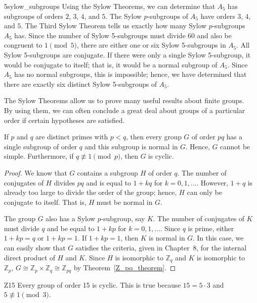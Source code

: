  
\begin{example}{5sylow_subgroups}
Using the Sylow Theorems, we can determine that $A_5$ has subgroups of
orders $2$, $3$, $4$, and $5$. The Sylow $p$-subgroups of $A_5$ have
orders $3$, $4$, and $5$. The Third Sylow Theorem tells us exactly how
many Sylow $p$-subgroups $A_5$ has. Since the number of Sylow 
5-subgroups must divide 60 and also be congruent to $1 \pmod{5}$,
there are either one or six Sylow 5-subgroups in $A_5$. All Sylow
5-subgroups are conjugate.  If there were only a single Sylow 
5-subgroup, it would be conjugate to itself; that is, it would be a
normal subgroup of $A_5$. Since $A_5$ has no normal subgroups, this is 
impossible; hence, we have determined that there are exactly six
distinct Sylow 5-subgroups of $A_5$. 
\end{example}
 
 
The Sylow Theorems allow us to prove many useful results about finite
groups. By using them, we can often conclude a great deal about groups 
of a particular order if certain hypotheses are satisfied.
 
 
\begin{theorem}
If $p$ and $q$ are distinct primes with $p<q$, then every group $G$ of
order $pq$ has a single subgroup of order $q$ and this subgroup is
normal in $G$.  Hence, $G$ cannot be simple.  Furthermore, if $q
\not\equiv 1 \pmod{p}$, then $G$ is cyclic.
\end{theorem}
 
 
\begin{proof}
We know that $G$ contains a subgroup $H$ of order $q$. The number of
conjugates of $H$  divides $pq$ and is equal to $1 +kq$ for $k = 0, 1,
\ldots$. However, $1+q$ is already too large to divide the order of
the group; hence, $H$ can only be conjugate to itself.  That is, $H$
must be normal in $G$. 
 
 
The group $G$ also has a Sylow $p$-subgroup, say $K$. The number of
conjugates of $K$ must divide $q$ and be equal to $1 + kp$ for $k = 0,
1, \ldots$. Since $q$ is prime, either $1 +kp=q$ or $1+kp =1$. If $1
+kp=1$, then $K$ is normal in $G$. In this case, we can easily show
that $G$ satisfies the criteria, given in Chapter~8, for the
internal direct product of $H$ and $K$.  Since $H$ is isomorphic to
${\mathbb Z}_q$ and $K$ is isomorphic to ${\mathbb Z}_p$, $G \cong {\mathbb
Z}_p \times {\mathbb Z}_q  \cong {\mathbb Z}_{pq}$ by Theorem~\ref{Z_pq_theorem}. 
\end{proof}
 
 
\begin{example}{Z15}
Every group of order 15 is cyclic.  This is true because $15 = 5 \cdot
3$ and $5 \not\equiv 1 \pmod{3}$. 
\end{example}
 
